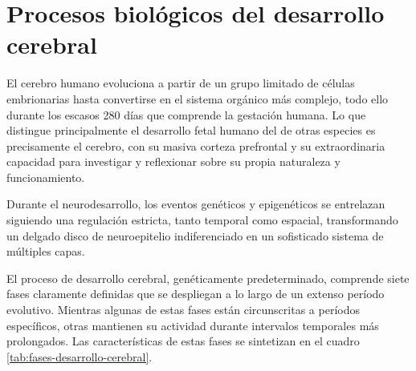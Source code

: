 \documentclass[11pt,letterpaper]{report}
\begin{document}
\section{Procesos biológicos del desarrollo cerebral}
El cerebro humano evoluciona a partir de un grupo limitado de células
embrionarias hasta convertirse en el sistema orgánico más complejo, todo ello
durante los escasos 280 días que comprende la gestación humana. Lo que 
distingue principalmente el desarrollo fetal humano del de otras especies es 
precisamente el cerebro, con su masiva corteza prefrontal y su extraordinaria 
capacidad para investigar y reflexionar sobre su propia naturaleza y 
funcionamiento. \cite{Polin124}

Durante el neurodesarrollo, los eventos genéticos y epigenéticos se entrelazan 
siguiendo una regulación estricta, tanto temporal como espacial, transformando
un delgado disco de neuroepitelio indiferenciado en un sofisticado sistema de
múltiples capas. \cite{Polin124}

El proceso de desarrollo cerebral, genéticamente predeterminado, comprende
siete fases claramente definidas que se despliegan a lo largo de un extenso
período evolutivo. \cite{Kolb7} Mientras algunas de estas fases están
circunscritas a períodos específicos, otras mantienen su actividad durante
intervalos temporales más prolongados. Las características de estas fases se
sintetizan en el cuadro \ref{tab:fases-desarrollo-cerebral}.

\begin{table}[htbp]
\caption{Siete fases del desarrollo cerebral}
\label{tab:fases-desarrollo-cerebral}
\end{table}
\end{document}
